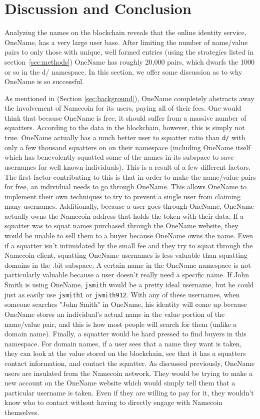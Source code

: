 \section{Discussion and Conclusion}
\label{sec:conclusion}

Analyzing the names on the blockchain reveals that the online identity service, OneName, has a very large user base. After limiting the number of name/value pairs to only those with unique, well formed entries (using the strategies listed in section~\ref{sec:methods}) OneName has roughly 20,000 pairs, which dwarfs the 1000 or so in the d/ namespace. In this section, we offer some discussion as to why OneName is so successful. 

As mentioned in (Section \ref{sec:background}), OneName completely abstracts away the involvement of Namecoin for its users, paying all of their fees. One would think that because OneName is free, it should suffer from a massive number of squatters. According to the data in the blockchain, however, this is simply not true. OneName actually has a much better user to squatter ratio than {\tt d/} with only a few thousand squatters on on their namespace (including OneName itself which has benevolently squatted some of the names in its subspace to save usernames for well known individuals). This is a result of a few different factors. The first factor contributing to this is that in order to make the name/value pairs for free, an individual needs to go through OneName. This allows OneName to implement their own techniques to try to prevent a single user from claiming many usernames. Additionally, because a user goes through OneName, OneName actually owns the Namecoin address that holds the token with their data. If a squatter was to squat names purchased through the OneName website, they would be unable to sell them to a buyer because OneName owns the name. Even if a squatter isn't intimidated by the small fee and they try to squat through the Namecoin client, squatting OneName usernames is less valuable than squatting domains in the .bit subspace. A certain name in the OneName namespace is not particularly valuable because a user doesn't really need a specific name. If John Smith is using OneName, {\tt jsmith} would be a pretty ideal username, but he could just as easily use {\tt jsmith1} or {\tt jsmith912}. With any of these usernames, when someone searches "John Smith" in OneName, his identity will come up because OneName stores an individual's actual name in the value portion of the name/value pair, and this is how most people will search for them (unlike a domain name). Finally, a squatter would be hard pressed to find buyers in this namespace. For domain names, if a user sees that a name they want is taken, they can look at the value stored on the blockchain, see that it has a squatters contact information, and contact the squatter. As discussed previously, OneName users are insulated from the Namecoin network. They would be trying to make a new account on the OneName website which would simply tell them that a particular username is taken. Even if they are willing to pay for it, they wouldn't know who to contact without having to directly engage with Namecoin themselves. 

